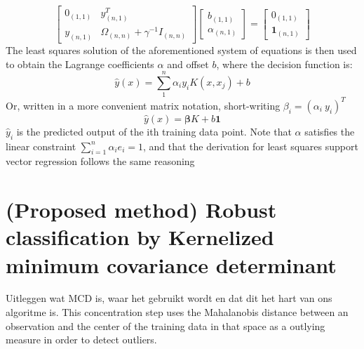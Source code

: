 \documentclass[preprint,12pt]{elsarticle}
\begin{document}
\begin{equation}
	\begin{bmatrix}
		0_{(1,1)} & y_{(n,1)}^T \\
		y_{(n,1)} & \Omega_{(n,n)} + \gamma^{-1} I_{(n,n)} 
		\end{bmatrix}	
		\begin{bmatrix}
		b_{(1,1)} \\
		\alpha_{(n,1)}
		\end{bmatrix}
		=
		\begin{bmatrix}
		0_{(1,1)} \\
		\mathbf{1}_{(n,1)}
	\end{bmatrix}	
\end{equation}
The least squares solution of the aforementioned system of equations is then used to  obtain the Lagrange coefficients $\alpha$ and offset $b$, where the decision function is:
\begin{equation}
	\hat{y}(x) = \sum_{1}^{n} \alpha_i y_i K(x, x_j) + b	
	\label{eq:classification}
\end{equation}
Or, written in a more convenient matrix notation, short-writing $\beta_i= (\alpha_i \  y_i)^T$
\begin{equation}
	\hat{y}(x) = \mathbf{\beta} K + b \mathbf{1}
	\label{eq:prediction}
\end{equation}
$\hat{y}_i$ is the predicted output of the ith training data point. Note that $\alpha$ satisfies the linear constraint $\sum_{i=1}^{n} \alpha_i  e_i = 1$, and that the derivation for least squares support vector regression follows the same reasoning %

\newpage
\section{(Proposed method) Robust classification by Kernelized minimum covariance determinant}

Uitleggen wat MCD is, waar het gebruikt wordt en dat dit het hart van ons algoritme is.
This concentration step uses the Mahalanobis distance between an observation and the center of the training data in that space as a outlying measure in order to detect outliers.\\
\end{document}
